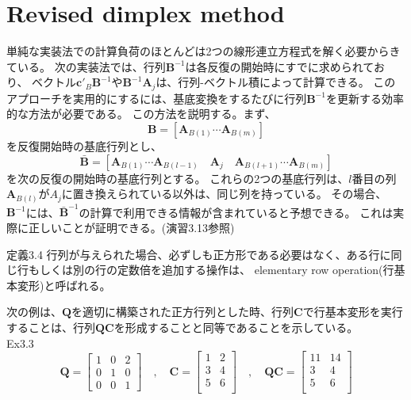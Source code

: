 \documentclass{jsarticle}
\begin{document}
\section*{Revised dimplex method}
単純な実装法での計算負荷のほとんどは2つの線形連立方程式を解く必要からきている。
次の実装法では、行列$\bm{B}^{-1}$は各反復の開始時にすでに求められており、
ベクトル$\bm{c}'_B\bm{B}^{-1}$や$\bm{B}^{-1}\bm{A}_j$は、行列-ベクトル積によって計算できる。
このアプローチを実用的にするには、基底変換をするたびに行列$\bm{B}^{-1}$を更新する効率的な方法が必要である。
この方法を説明する。まず、
\begin{equation}
  \bm{B}=[\bm{A}_{B(1)} \cdots \bm{A}_{B(m)}]
\end{equation}
を反復開始時の基底行列とし、
\begin{equation}
  \bar{\bm{B}}=[\bm{A}_{B(1)} \cdots \bm{A}_{B(l-1)} \quad \bm{A}_j \quad \bm{A}_{B(l+1)} \cdots \bm{A}_{B(m)}]
\end{equation}
を次の反復の開始時の基底行列とする。
これらの2つの基底行列は、$l$番目の列$\bm{A}_{B(l)}$が${A}_j$に置き換えられている以外は、同じ列を持っている。
その場合、$\bm{B}^{-1}$には、$\bar{\bm{B}}^{-1}$の計算で利用できる情報が含まれていると予想できる。
これは実際に正しいことが証明できる。(演習3.13参照)

\begin{itembox}[l]{定義3.4}
  行列が与えられた場合、必ずしも正方形である必要はなく、ある行に同じ行もしくは別の行の定数倍を追加する操作は、
  elementary row operation(行基本変形)と呼ばれる。
\end{itembox}
次の例は、$\bm{Q}$を適切に構築された正方行列とした時、行列$\bm{C}$で行基本変形を実行することは、行列$\bm{QC}$を形成することと同等であることを示している。\\ 
Ex3.3\\
\begin{equation}
  \bm{Q} = 
  \begin{bmatrix}
    1 & 0 & 2 \\
    0 & 1 & 0 \\
    0 & 0 & 1
  \end{bmatrix}
  \quad,\quad
  \bm{C}=
  \begin{bmatrix}
    1 & 2 \\
    3 & 4 \\
    5 & 6 \\
  \end{bmatrix}
  \quad,\quad
  \bm{QC} = 
  \begin{bmatrix}
    11&14\\
    3&4\\
    5&6\\
  \end{bmatrix}
\end{equation}
\end{document}
